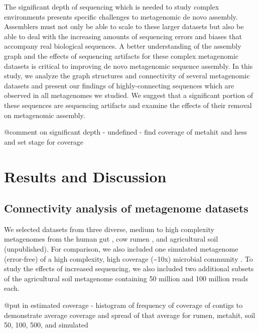 \documentclass[11pt]{article} %
\begin{document}
The significant depth of sequencing which is needed to study complex environments presents specific challenges to metagenomic de novo assembly.  Assemblers must not only be able to scale to these larger datasets but also be able to deal with the increasing amounts of sequencing errors and biases that accompany real biological sequences.   A better understanding of the assembly graph and the effects of sequencing artifacts for these complex metagenomic datasets is critical to improving de novo metagenomic sequence assembly.  In this study, we analyze the graph structures and connectivity of several metagenomic datasets and present our findings of highly-connecting sequences which are observed in all metagenomes we studied.  We suggest that a significant portion of these sequences are sequencing artifacts and examine the effects of their removal on metagenomic assembly.

@comment on significant depth - undefined - find coverage of metahit and hess and set stage for coverage

\section{Results and Discussion}
\subsection{Connectivity analysis of metagenome datasets}

We selected datasets from three diverse, medium to high complexity metagenomes from the human gut \cite{Qin:2010p189}, cow rumen \cite{Hess:2011p686}, and agricultural soil (unpublished). For comparison, we also included one simulated metagenome (error-free) of a high complexity, high coverage (\textasciitilde{}10x) microbial community \cite{Pignatelli:2011p742}. To study the effects of increased sequencing, we also included two additional subsets of the agricultural soil metagenome containing 50 million and 100 million reads each. 

@put in estimated coverage - histogram of frequency of coverage of contigs to demonstrate average coverage and spread of that average for rumen, metahit, soil 50, 100, 500, and simulated
\end{document}
